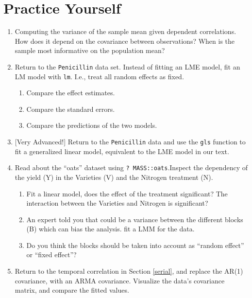 \documentclass[]{book}
\providecommand{\tightlist}{%
  \setlength{\itemsep}{0pt}\setlength{\parskip}{0pt}}
\theoremstyle{definition}
\theoremstyle{definition}
\theoremstyle{definition}
\theoremstyle{remark}
\begin{document}
\hypertarget{practice-yourself-4}{%
\section{Practice Yourself}\label{practice-yourself-4}}

\begin{enumerate}
\def\labelenumi{\arabic{enumi}.}
\item
  Computing the variance of the sample mean given dependent correlations. How does it depend on the covariance between observations? When is the sample most informative on the population mean?
\item
  Return to the \texttt{Penicillin} data set. Instead of fitting an LME model, fit an LM model with \texttt{lm}. I.e., treat all random effects as fixed.

  \begin{enumerate}
  \def\labelenumii{\alph{enumii}.}
  \tightlist
  \item
    Compare the effect estimates.
  \item
    Compare the standard errors.
  \item
    Compare the predictions of the two models.
  \end{enumerate}
\item
  {[}Very Advanced!{]} Return to the \texttt{Penicillin} data and use the \texttt{gls} function to fit a generalized linear model, equivalent to the LME model in our text.
\item
  Read about the ``oats'' dataset using \texttt{?\ MASS::oats}.Inspect the dependency of the yield (Y) in the Varieties (V) and the Nitrogen treatment (N).

  \begin{enumerate}
  \def\labelenumii{\arabic{enumii}.}
  \tightlist
  \item
    Fit a linear model, does the effect of the treatment significant? The interaction between the Varieties and Nitrogen is significant?
  \item
    An expert told you that could be a variance between the different blocks (B) which can bias the analysis. fit a LMM for the data.
  \item
    Do you think the blocks should be taken into account as ``random effect'' or ``fixed effect''?
  \end{enumerate}
\item
  Return to the temporal correlation in Section \ref{serial}, and replace the AR(1) covariance, with an ARMA covariance. Visualize the data's covariance matrix, and compare the fitted values.
\end{enumerate}
\end{document}
